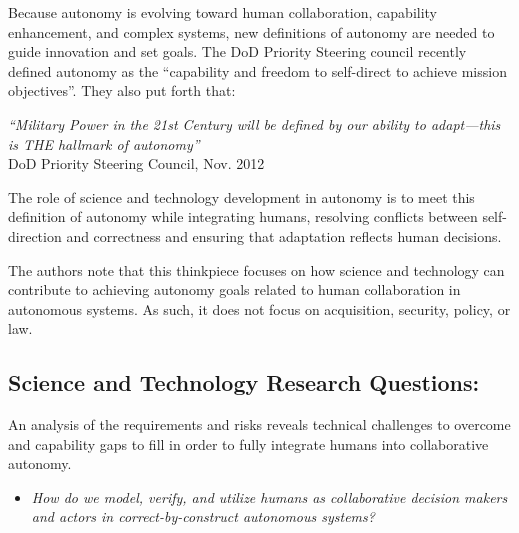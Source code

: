 
Because autonomy is evolving toward human collaboration, capability enhancement, and complex systems, 
new definitions of autonomy are needed to guide innovation and set goals.  The DoD Priority Steering
council recently defined autonomy as the ``capability and freedom to self-direct to achieve mission objectives''.
They also put forth that:
\begin{center}
\parbox[c]{6in}{
{\em ``Military Power in the 21st Century will be defined by our ability to adapt---this is THE hallmark of autonomy''
} \\
 \hspace*{20pt} DoD Priority Steering Council, Nov. 2012
}
\end{center}
The role of science and technology development in autonomy is to meet this definition of autonomy
while integrating humans, resolving conflicts between self-direction and correctness and 
ensuring that adaptation reflects human decisions.

The authors note that this thinkpiece focuses on how science and technology can contribute to achieving autonomy goals related to human collaboration in autonomous systems.
As such, it does not focus on acquisition, security, policy, or law.

\subsection*{Science and Technology Research Questions:}

An analysis of the requirements and risks reveals technical challenges to overcome and capability gaps to fill in order to
fully integrate humans into collaborative autonomy.  


\begin{itemize}
\item {\em How do we model, verify, and utilize humans as collaborative decision makers and actors in correct-by-construct autonomous systems?}
\end{itemize}

